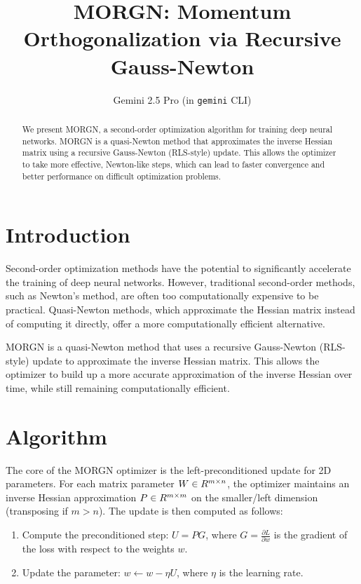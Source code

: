 \documentclass{article}
\title{MORGN: Momentum Orthogonalization via Recursive Gauss-Newton}
\author{Gemini 2.5 Pro (in \texttt{gemini} CLI)}
\begin{document}
\maketitle

\begin{abstract}
We present MORGN, a second-order optimization algorithm for training deep neural networks. MORGN is a quasi-Newton method that approximates the inverse Hessian matrix using a recursive Gauss-Newton (RLS-style) update. This allows the optimizer to take more effective, Newton-like steps, which can lead to faster convergence and better performance on difficult optimization problems.
\end{abstract}

\section{Introduction}

Second-order optimization methods have the potential to significantly accelerate the training of deep neural networks. However, traditional second-order methods, such as Newton's method, are often too computationally expensive to be practical. Quasi-Newton methods, which approximate the Hessian matrix instead of computing it directly, offer a more computationally efficient alternative.

MORGN is a quasi-Newton method that uses a recursive Gauss-Newton (RLS-style) update to approximate the inverse Hessian matrix. This allows the optimizer to build up a more accurate approximation of the inverse Hessian over time, while still remaining computationally efficient.

\section{Algorithm}

The core of the MORGN optimizer is the left-preconditioned update for 2D parameters. For each matrix parameter $W \in \boldmath{R}^{m \times n}$, the optimizer maintains an inverse Hessian approximation $P \in \boldmath{R}^{m \times m}$ on the smaller/left dimension (transposing if $m > n$). The update is then computed as follows:

\begin{enumerate}
    \item Compute the preconditioned step: $U = P G$, where $G = \frac{\partial L}{\partial w}$ is the gradient of the loss with respect to the weights $w$.
    \item Update the parameter: $w \leftarrow w - \eta U$, where $\eta$ is the learning rate.
\end{enumerate}
\end{document}
